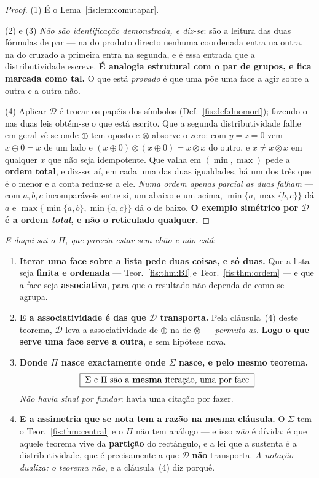 \documentclass[livro.tex]{subfiles}
\begin{document}
\begin{proof}
(1) É o Lema~\ref{fis:lem:comutapar}.

(2) e (3) \emph{Não são identificação demonstrada, e diz-se}: são a leitura das
duas fórmulas de par --- na do produto directo nenhuma coordenada entra na outra,
na do cruzado a primeira entra na segunda, e é essa entrada que a
distributividade escreve. \textbf{É analogia estrutural com o par de grupos, e
fica marcada como tal.} O que está \emph{provado} é que uma põe uma face a agir
sobre a outra e a outra não.

(4) Aplicar $\mathcal{D}$ é trocar os papéis dos símbolos
(Def.~\ref{fis:def:duomorf}); fazendo-o nas duas leis obtém-se o que está
escrito. Que a segunda distributividade falhe em geral vê-se onde $\oplus$ tem
oposto e $\otimes$ absorve o zero: com $y=z=0$ vem $x\oplus0=x$ de um lado e
$(x\oplus0)\otimes(x\oplus0)=x\otimes x$ do outro, e $x\neq x\otimes x$ em
qualquer $x$ que não seja idempotente. Que valha em $(\min,\max)$ pede a
\textbf{ordem total}, e diz-se: aí, em cada uma das duas igualdades, há um dos
três que é o menor e a conta reduz-se a ele. \emph{Numa ordem apenas parcial as
duas falham} --- com $a,b,c$ incomparáveis entre si, um abaixo e um acima,
$\min\{a,\max\{b,c\}\}$ dá $a$ e $\max\{\min\{a,b\},\min\{a,c\}\}$ dá o de
baixo. \textbf{O exemplo simétrico por $\mathcal{D}$ é a ordem \emph{total}, e
não o reticulado qualquer.}
\end{proof}

\begin{corolario}\label{fis:cor:produto}
\emph{E daqui sai o $\Pi$, que parecia estar sem chão e não está}:
\begin{enumerate}\itemsep3pt
\item[(1)] \textbf{Iterar uma face sobre a lista pede duas coisas, e só duas.}
Que a lista seja \textbf{finita e ordenada} --- Teor.~\ref{fis:thm:BI} e
Teor.~\ref{fis:thm:ordem} --- e que a face seja \textbf{associativa}, para que o
resultado não dependa de como se agrupa.
\item[(2)] \textbf{E a associatividade é das que $\mathcal{D}$ transporta.} Pela
cláusula~(4) deste teorema, $\mathcal{D}$ leva a associatividade de $\oplus$ na de
$\otimes$ --- \emph{permuta-as}. \textbf{Logo o que serve uma face serve a outra},
e sem hipótese nova.
\item[(3)] \textbf{Donde $\Pi$ nasce exactamente onde $\Sigma$ nasce, e pelo mesmo
teorema.}
\[
\boxed{\;\Sigma\ \text{e}\ \Pi\ \text{são a \textbf{mesma} iteração, uma por face}\;}
\]
\emph{Não havia sinal por fundar}: havia uma citação por fazer.
\item[(4)] \textbf{E a assimetria que se nota tem a razão na mesma cláusula.} O
$\Sigma$ tem o Teor.~\ref{fis:thm:central} e o $\Pi$ não tem análogo --- e isso
\emph{não} é dívida: é que aquele teorema vive da \textbf{partição} do rectângulo,
e a lei que a sustenta é a distributividade, que é precisamente a que
$\mathcal{D}$ \textbf{não} transporta. \emph{A notação dualiza; o teorema não}, e
a cláusula~(4) diz porquê.
\end{enumerate}
\end{corolario}
\end{document}
